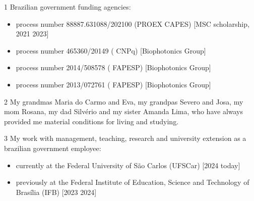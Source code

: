 \documentclass[letterpaper,10pt,english]{sphinxmanual}
\begin{document}
\begin{DUlineblock}{0em}
\item[] 1\sphinxhyphen{} Brazilian government funding agencies:
\end{DUlineblock}
\begin{itemize}
\item {} 
\sphinxAtStartPar
process number 88887.631088/2021\sphinxhyphen{}00 (PROEX \sphinxhyphen{} CAPES) {[}MSC scholarship, 2021 \sphinxhyphen{} 2023{]}

\item {} 
\sphinxAtStartPar
process number 465360/2014\sphinxhyphen{}9 ( \sphinxhyphen{} CNPq) {[}Biophotonics Group{]}

\item {} 
\sphinxAtStartPar
process number 2014/50857\sphinxhyphen{}8 ( \sphinxhyphen{} FAPESP) {[}Biophotonics Group{]}

\item {} 
\sphinxAtStartPar
process number 2013/07276\sphinxhyphen{}1 ( \sphinxhyphen{} FAPESP) {[}Biophotonics Group{]}

\end{itemize}

\begin{DUlineblock}{0em}
\item[] 2\sphinxhyphen{} My grandmas Maria do Carmo and Eva, my grandpas Severo and Josa, my mom Rosana, my dad Silvério and my sister Amanda Lima, who have always provided me material conditions for living and studying.
\end{DUlineblock}

\begin{DUlineblock}{0em}
\item[] 3\sphinxhyphen{} My work with management, teaching, research and university extension as a brazilian government employee:
\end{DUlineblock}
\begin{itemize}
\item {} 
\sphinxAtStartPar
currently at the Federal University of São Carlos (UFSCar) {[}2024 \sphinxhyphen{} today{]}

\item {} 
\sphinxAtStartPar
previously at the Federal Institute of Education, Science and Technology of Brasília (IFB) {[}2023 \sphinxhyphen{} 2024{]}

\end{itemize}
\end{document}
